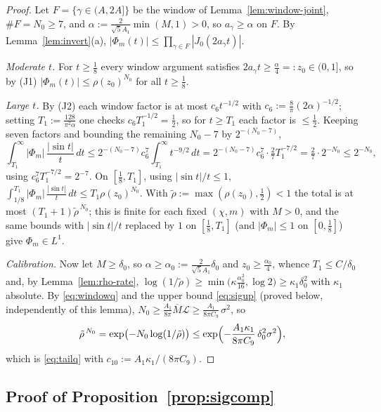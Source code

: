 \begin{proof}
Let $F=\{\gamma\in(A,2A]\}$ be the window of
Lemma~\ref{lem:window-joint}, $\#F=N_0\ge7$, and
$\alpha:=\tfrac{2}{\sqrt5A_1}\min(M,1)>0$, so $a_\gamma\ge\alpha$ on
$F$. By Lemma~\ref{lem:invert}(a),
$|\Phi_m(t)|\le\prod_{\gamma\in F}|J_0(2a_\gamma t)|$.

\emph{Moderate $t$.} For $t\ge\tfrac18$ every window argument satisfies
$2a_\gamma t\ge\tfrac{\alpha}4=:z_0\in(0,1]$, so by (J1)
$|\Phi_m(t)|\le\rho(z_0)^{N_0}$ for all $t\ge\tfrac18$.

\emph{Large $t$.} By (J2) each window factor is at most
$c_6t^{-1/2}$ with $c_6:=\tfrac8\pi(2\alpha)^{-1/2}$; setting
$T_1:=\tfrac{128}{\pi^2\alpha}$ one checks $c_6T_1^{-1/2}=\tfrac12$,
so for $t\ge T_1$ each factor is $\le\tfrac12$. Keeping seven factors
and bounding the remaining $N_0-7$ by $2^{-(N_0-7)}$,
\[
\int_{T_1}^\infty|\Phi_m|\,\frac{|\sin t|}{t}\,dt
\le2^{-(N_0-7)}c_6^{7}\int_{T_1}^\infty t^{-9/2}\,dt
=2^{-(N_0-7)}c_6^{7}\cdot\tfrac27T_1^{-7/2}
=\tfrac27\cdot2^{-N_0}\le2^{-N_0},
\]
using $c_6^{7}T_1^{-7/2}=2^{-7}$. On $[\tfrac18,T_1]$, using
$|\sin t|/t\le1$,
$\int_{1/8}^{T_1}|\Phi_m|\,\frac{|\sin t|}t\,dt\le T_1\rho(z_0)^{N_0}$.
With $\tilde\rho:=\max(\rho(z_0),\tfrac12)<1$ the total is at most
$(T_1+1)\tilde\rho^{\,N_0}$; this is finite for each fixed $(\chi,m)$
with $M>0$, and the same bounds with $|\sin t|/t$ replaced by $1$ on
$[\tfrac18,T_1]$ (and $|\Phi_m|\le1$ on $[0,\tfrac18]$) give
$\Phi_m\in L^1$.

\emph{Calibration.} Now let $M\ge\delta_0$, so
$\alpha\ge\alpha_0:=\tfrac{2}{\sqrt5A_1}\delta_0$ and
$z_0\ge\tfrac{\alpha_0}4$, whence $T_1\le C/\delta_0$ and, by
Lemma~\ref{lem:rho-rate},
$\log(1/\tilde\rho)\ge\min\bigl(\kappa\tfrac{\alpha_0^2}{16},\log2\bigr)
\ge\kappa_1\delta_0^{2}$ with $\kappa_1$ absolute. By
\eqref{eq:windowq} and the upper bound \eqref{eq:sigup} (proved below,
independently of this lemma),
$N_0\ge\tfrac{A_1}{8\pi}\overline M\mathcal L
\ge\tfrac{A_1}{8\pi C_9}\,\sigma^{2}$, so
\[
\tilde\rho^{\,N_0}
=\exp\bigl(-N_0\log(1/\tilde\rho)\bigr)
\le\exp\Bigl(-\frac{A_1\kappa_1}{8\pi C_9}\,\delta_0^{2}\sigma^{2}\Bigr),
\]
which is \eqref{eq:tailq} with $c_{10}:=A_1\kappa_1/(8\pi C_9)$.
\end{proof}

\subsection*{Proof of Proposition~\ref{prop:sigcomp}}

